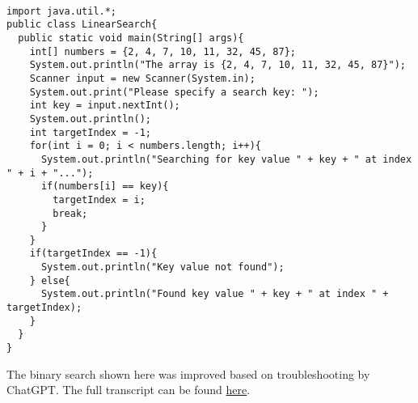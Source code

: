 \documentclass[10pt]{mypackage}
\begin{document}
  \begin{lstlisting}[style=javastyle,title=Writing a Linear Search]
  
import java.util.*;
public class LinearSearch{
  public static void main(String[] args){
    int[] numbers = {2, 4, 7, 10, 11, 32, 45, 87};
    System.out.println("The array is {2, 4, 7, 10, 11, 32, 45, 87}");
    Scanner input = new Scanner(System.in);
    System.out.print("Please specify a search key: ");
    int key = input.nextInt();
    System.out.println();
    int targetIndex = -1;
    for(int i = 0; i < numbers.length; i++){
      System.out.println("Searching for key value " + key + " at index " + i + "...");
      if(numbers[i] == key){
        targetIndex = i;
        break;
      }
    }
    if(targetIndex == -1){
      System.out.println("Key value not found");
    } else{
      System.out.println("Found key value " + key + " at index " + targetIndex);
    }
  }
}
  \end{lstlisting}
  The binary search shown here was improved based on troubleshooting by ChatGPT. The full transcript can be found \href{https://chatgpt.com/share/67a2f573-a470-800d-b6d4-aa7e41c4be90}{here}.
\end{document}
